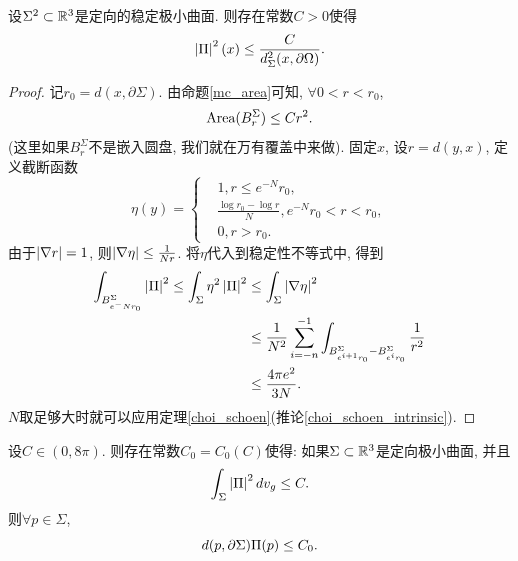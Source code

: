 \begin{theorem}
    设$\Sigma^2 \subset \mathbb{R}^3$是定向的稳定极小曲面. 则存在常数$C>0$使得
    \begin{equation}
        \left | {\Pi} \right |^2(x) \le \frac{C}{d^2_\Sigma(x,\partial \Omega)}.
    \end{equation}
\end{theorem}
\begin{proof}
    记$r_0=d(x,\partial \Sigma)$. 由命题\eqref{mc_area}可知, $\forall 0<r < r_0$, 
    \begin{equation}
        \text{Area}(B^\Sigma_r) \le Cr^2.
    \end{equation}
    (这里如果$B^\Sigma_r$不是嵌入圆盘, 我们就在万有覆盖中来做). 固定$x$, 设$r=d(y,x)$, 定义截断函数
    \begin{equation}
        \eta(y)=\left\{
            \begin{aligned}
                & 1, r\le e^{-N}r_0, \\
                & \frac{\log r_0-\log r}{N}, e^{-N}r_0 < r < r_0, \\
                & 0, r>r_0.
            \end{aligned}
        \right.
    \end{equation}
    由于$\left | \nabla r \right |=1$, 则$\left | \nabla \eta \right | \le \frac{1}{Nr}$. 将$\eta$代入到稳定性不等式中, 得到
    \begin{equation}
        \begin{split}
            \int_{B^\Sigma_{e^-Nr_0}}\left | {\Pi} \right |^2 \le \int_\Sigma \eta^2 \left | {\Pi} \right |^2 &\le \int_\Sigma \left | \nabla \eta \right |^2  \\
            &\le \frac{1}{N^2}\sum_{i=-n}^{-1}\int_{B_{e^{i+1}r_0}^\Sigma-B_{e^ir_0}^\Sigma}\frac{1}{r^2} \\
            &\le \frac{4\pi e^2}{3N}.
        \end{split}
    \end{equation}
    $N$取足够大时就可以应用定理\eqref{choi_schoen}(推论\eqref{choi_schoen_intrinsic}).
\end{proof}
\begin{theorem} \label{curvature_estimate_4pi}
    设$C \in (0,8\pi)$. 则存在常数$C_0=C_0(C)$使得: 如果$\Sigma \subset \mathbb{R}^3$是定向极小曲面, 并且
    \begin{equation}
        \int_\Sigma \left | {\Pi} \right |^2 dv_g \le C.
    \end{equation}
    则$\forall p \in \Sigma$,
    \begin{equation}
        d(p,{\partial} \Sigma){\Pi}(p) \le C_0.
    \end{equation}
\end{theorem}
